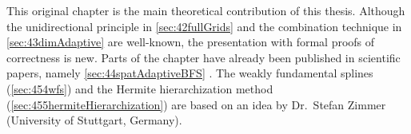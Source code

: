 This original chapter is the main theoretical contribution of this thesis.
Although the unidirectional principle in \cref{sec:42fullGrids} and
the combination technique in \cref{sec:43dimAdaptive} are well-known,
the presentation with formal proofs of correctness is new.
Parts of the chapter have already been published in scientific papers,
namely \cref{sec:44spatAdaptiveBFS} \cite{Valentin18Fundamental}.
The weakly fundamental splines (\cref{sec:454wfs}) and the
Hermite hierarchization method (\cref{sec:455hermiteHierarchization})
are based on an idea by Dr.\ Stefan Zimmer (University of Stuttgart, Germany).









\cleardoublepage
